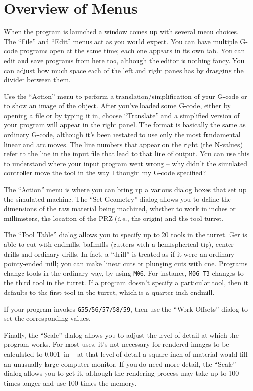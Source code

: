 \documentclass[titlepage,oneside,10pt]{article}
\begin{document}
\section{Overview of Menus}

When the program is launched a window comes up with several menu
choices. The ``File'' and ``Edit'' menus act as you would expect. You
can have multiple G-code programs open at the same time; each one
appears in its own tab. You can edit and save programs from here too,
although the editor is nothing fancy. You can adjust how much space
each of the left and right panes has by dragging the divider between them.

Use the ``Action'' menu to perform a translation/simplification of
your G-code or to show an image of the object. After you've loaded
some G-code, either by opening a file or by typing it in, choose
``Translate'' and a simplified version of your program will appear in
the right panel. The format is basically the same as ordinary G-code,
although it's been restated to use only 
the most fundamental linear and arc moves. The line numbers that
appear on the right (the N-values) refer to the line in the input file
that lead to that line of output. You can use this to understand where
your input program went wrong -- why didn't the simulated controller
move the tool in the way I thought my G-code specified?

The ``Action'' menu is where you can bring up a various dialog boxes
that set up the simulated machine. The ``Set Geometry'' dialog allows
you to define the dimensions of the raw material being machined,
whether to work in inches or millimeters, the location of the PRZ
(\emph{i.e.}, the origin) and the tool turret. 

The ``Tool Table'' dialog allows you to specify up to 20 tools in the
turret. Ger is able to cut with endmills, ballmills (cutters with a
hemispherical tip), center drills and ordinary drills. In fact, a
``drill'' is treated as if it were an ordinary pointy-ended mill; you
can make linear cuts or plunging cuts with one. Programs change tools
in the ordinary way, by using {\tt M06}. For instance, {\tt M06 T3}
changes to the third tool in the turret. If a program doesn't specify
a particular tool, then it defaults to the first tool in the turret,
which is a quarter-inch endmill.

If your program invokes {\tt G55/56/57/58/59}, then use the ``Work
Offsets'' dialog to set the corresponding values.

Finally, the ``Scale'' dialog allows you to adjust the level of detail
at which the program works. For most uses, it's not necessary for
rendered images to be calculated to 0.001~in -- at that level of
detail a square inch of material would fill an unusually large
computer monitor. If you do need more detail, the ``Scale'' dialog
allows you to get it, although the rendering process may take up to
100 times longer and use 100 times the memory.
\end{document}
